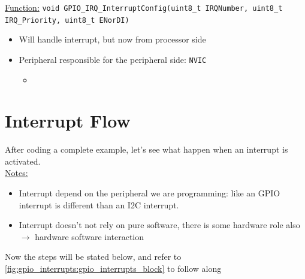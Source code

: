 \underline{Function:} \verb|void GPIO_IRQ_InterruptConfig(uint8_t IRQNumber, uint8_t IRQ_Priority, uint8_t ENorDI)|

\begin{itemize}

\item Will handle interrupt, but now from processor side

\item Peripheral responsible for the peripheral side: \verb|NVIC|

	\begin{itemize}
	\item 
	\end{itemize}

\end{itemize}

\newpage
\section{Interrupt Flow}


After coding a complete example, let's see what happen when an interrupt is activated.\\

\underline{Notes:} 

\begin{itemize}

\item Interrupt depend on the peripheral we are programming: like an GPIO interrupt is different than an I2C interrupt.

\item Interrupt doesn't not rely on pure software, there is some hardware role also $\rightarrow$ hardware software interaction

\end{itemize}


Now the steps will be stated below, and refer to \autoref{fig:gpio_interrupts:gpio_interrupts_block} to follow along

